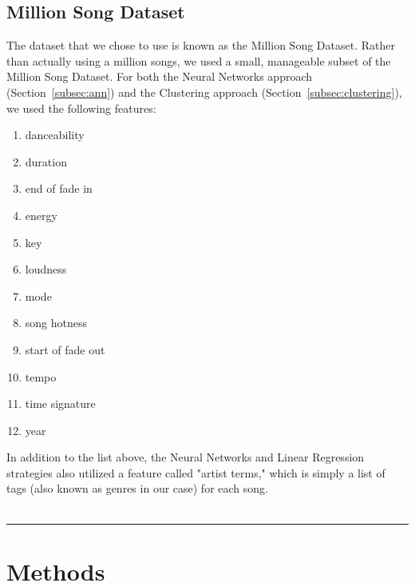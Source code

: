 \documentclass[12pt]{article}
\newcommand{\horizontalLine}{
	\begin{center}
		\hrule width 1.0\textwidth
	\end{center}
}
\begin{document}
\subsection{Million Song Dataset}
\label{subsec:datasetIntro}
The dataset that we chose to use is known as the Million Song Dataset. Rather than actually using a million songs, we used a small, manageable subset of the Million Song Dataset. For both the Neural Networks approach (Section~\ref{subsec:ann}) and the Clustering approach (Section~\ref{subsec:clustering}), we used the following features:
\begin{enumerate}
    \item danceability
    \vspace{-3.5mm}
    \item duration
    \vspace{-3.5mm}
    \item end of fade in
    \vspace{-3.5mm}
    \item energy
    \vspace{-3.5mm}
    \item key
    \vspace{-3.5mm}
    \item loudness
    \vspace{-3.5mm}
    \item mode
    \vspace{-3.5mm}
    \item song hotness
    \vspace{-3.5mm}
    \item start of fade out
    \vspace{-3.5mm} 
    \item tempo
    \vspace{-3.5mm}
    \item time signature
    \vspace{-3.5mm}
    \item year
\end{enumerate}

In addition to the list above, the Neural Networks and Linear Regression strategies also utilized a feature called "artist terms," which is simply a list of tags (also known as genres in our case) for each song. 
\\
\\

\horizontalLine
\section{Methods}
\label{sec:methods}
\end{document}
